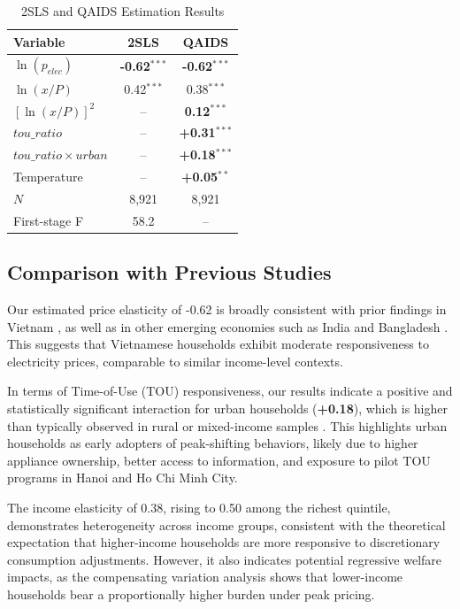 \documentclass[12pt,a4paper]{article}
\begin{document}
	\begin{table}[H]
		\centering
		\caption{2SLS and QAIDS Estimation Results}
		\label{tab:results}
		\begin{tabular}{lcc}
			\toprule
			Variable & 2SLS & QAIDS \\
			\midrule
			$\ln(p_{elec})$ & \textbf{-0.62}$^{***}$ & \textbf{-0.62}$^{***}$ \\
			$\ln(x/P)$ & 0.42$^{***}$ & 0.38$^{***}$ \\
			$[\ln(x/P)]^2$ & -- & \textbf{0.12}$^{***}$ \\
			$tou\_ratio$ & -- & \textbf{+0.31}$^{***}$ \\
			$tou\_ratio \times urban$ & -- & \textbf{+0.18}$^{***}$ \\
			Temperature & -- & \textbf{+0.05}$^{**}$ \\
			$N$ & 8,921 & 8,921 \\
			First-stage F & 58.2 & -- \\
			\bottomrule
		\end{tabular}
	\end{table}
	
	\subsection{Comparison with Previous Studies}
	
	Our estimated price elasticity of -0.62 is broadly consistent with prior findings in Vietnam \citep{le2020}, as well as in other emerging economies such as India \citep{filippini2016} and Bangladesh \citep{balarama2020}. This suggests that Vietnamese households exhibit moderate responsiveness to electricity prices, comparable to similar income-level contexts.  
	
	In terms of Time-of-Use (TOU) responsiveness, our results indicate a positive and statistically significant interaction for urban households (\textbf{+0.18}), which is higher than typically observed in rural or mixed-income samples \citep{faruqui2010, jessoe2014}. This highlights urban households as early adopters of peak-shifting behaviors, likely due to higher appliance ownership, better access to information, and exposure to pilot TOU programs in Hanoi and Ho Chi Minh City.  
	
	The income elasticity of 0.38, rising to 0.50 among the richest quintile, demonstrates heterogeneity across income groups, consistent with the theoretical expectation that higher-income households are more responsive to discretionary consumption adjustments. However, it also indicates potential regressive welfare impacts, as the compensating variation analysis shows that lower-income households bear a proportionally higher burden under peak pricing.  
	
\end{document}
